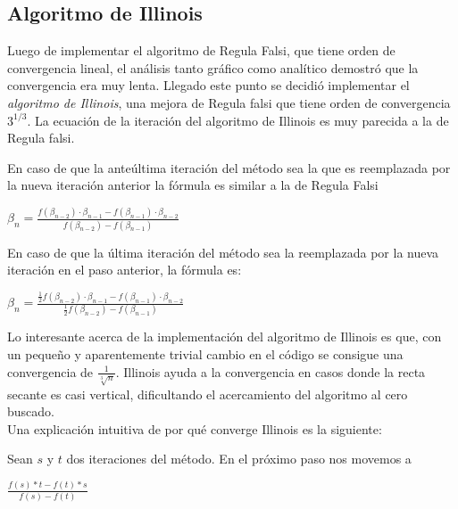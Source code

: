 \subsection{Algoritmo de Illinois}

Luego de implementar el algoritmo de Regula Falsi, que tiene orden de 
convergencia lineal, el an\'alisis tanto gr\'afico como anal\'itico demostr\'o
que la convergencia era muy lenta. 
Llegado este punto se decidi\'o implementar el \textit{algoritmo de Illinois}, una mejora
de Regula falsi que tiene orden de convergencia $3^{1/3}$. 
La ecuaci\'on de la iteraci\'on del algoritmo de Illinois es muy 
parecida a la de Regula falsi.

En caso de que la ante\'ultima iteraci\'on del m\'etodo sea la que es 
reemplazada por la nueva iteraci\'on anterior la f\'ormula 
es similar a la de Regula Falsi

\begin{center}
$\beta_n = \frac{f(\beta_{n-2})\cdot \beta_{n-1} - f(\beta_{n-1})\cdot\beta_{n-2}}
{f(\beta_{n-2})-f(\beta_{n-1})}$\\
\end{center}

En caso de que la \'ultima iteraci\'on del m\'etodo sea la reemplazada 
por la nueva iteraci\'on en el paso anterior, la f\'ormula es:
\begin{center}
$\beta_n = \frac{\frac{1}{2}f(\beta_{n-2})\cdot \beta_{n-1} - 
f(\beta_{n-1})\cdot\beta_{n-2}}
{\frac{1}{2}f(\beta_{n-2})-f(\beta_{n-1})}$ \\
\end{center}

Lo interesante acerca de la implementaci\'on del algoritmo de Illinois es
que, con un peque\~no y aparentemente trivial cambio en el c\'odigo se consigue una
convergencia de $\frac{1}{\sqrt[3]{n}}$. Illinois ayuda a la convergencia en casos
donde la recta secante es casi vertical, dificultando el acercamiento del
algoritmo al cero buscado.\\

Una explicaci\'on intuitiva de por qu\'e converge Illinois es la siguiente: 

Sean $s$ y $t$ dos iteraciones del m\'etodo. En el pr\'oximo paso nos movemos a 

\begin{center}
$\frac{f(s)*t-f(t)*s}{f(s)-f(t)}$\\
\end{center}

